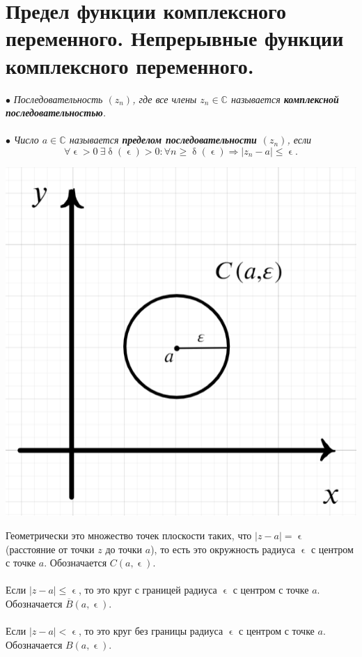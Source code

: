 \documentclass[a4paper, 12pt]{article}
\newcommand{\Cm}{\mathbb{C}}
\renewcommand{\leq}{\leqslant}
\renewcommand{\delta}{\updelta}
\renewcommand{\epsilon}{\upvarepsilon}
\newcommand{\limdef}{\forall \epsilon >0\ \exists \delta (\epsilon) > 0}
\begin{document}
\section{Предел функции комплексного переменного. Непрерывные функции комплексного переменного.}
$\bullet$ \textit{Последовательность $(z_n)$, где все члены $z_n \in \Cm$ называется \textbf{комплексной последовательностью}.}\\\\
$\bullet$ \textit{Число $a\in \Cm$ называется \textbf{пределом последовательности $(z_n)$}, если} $$\limdef : \forall n \geqslant \delta (\epsilon) \Rightarrow |z_n - a | \leq \epsilon.$$
\noindent
\parbox[b][4.5cm][t]{10mm}{
	\includegraphics[scale=0.3]{images/009.png}}
\hfill
\parbox[b][4cm][t]{110mm}{Геометрически это множество точек плоскости таких, что $|z-a| = \epsilon$ (расстояние от точки $z$ до точки $a$), то есть это окружность радиуса $\epsilon$ с центром с точке $a$. Обозначается $C(a,\epsilon)$.\\\\Если $|z-a|\leqslant \epsilon$, то это круг с границей радиуса $\epsilon$ с центром с точке $a$. Обозначается $\overline{B}(a,\epsilon)$.\\\\
	Если $|z-a|< \epsilon$, то это круг без границы радиуса $\epsilon$ с центром с точке $a$. Обозначается ${B}(a,\epsilon)$.}\\\\
\end{document}
